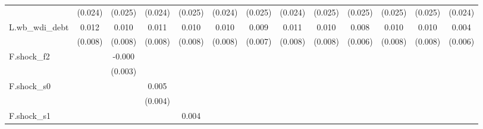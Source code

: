 {\begin{tabular}{l*{12}{c}}
            &     (0.024)         &     (0.025)         &     (0.024)         &     (0.025)         &     (0.024)         &     (0.025)         &     (0.024)         &     (0.025)         &     (0.025)         &     (0.025)         &     (0.025)         &     (0.024)         \\
\addlinespace
L.wb\_wdi\_debt&       0.012         &       0.010         &       0.011         &       0.010         &       0.010         &       0.009         &       0.011         &       0.010         &       0.008         &       0.010         &       0.010         &       0.004         \\
            &     (0.008)         &     (0.008)         &     (0.008)         &     (0.008)         &     (0.008)         &     (0.007)         &     (0.008)         &     (0.008)         &     (0.006)         &     (0.008)         &     (0.008)         &     (0.006)         \\
\addlinespace
F.shock\_f2  &                     &      -0.000         &                     &                     &                     &                     &                     &                     &                     &                     &                     &                     \\
            &                     &     (0.003)         &                     &                     &                     &                     &                     &                     &                     &                     &                     &                     \\
\addlinespace
F.shock\_s0  &                     &                     &       0.005         &                     &                     &                     &                     &                     &                     &                     &                     &                     \\
            &                     &                     &     (0.004)         &                     &                     &                     &                     &                     &                     &                     &                     &                     \\
\addlinespace
F.shock\_s1  &                     &                     &                     &       0.004         &                     &                     &                     &                     &                     &                     &                     &                     \\

\end{tabular}}

